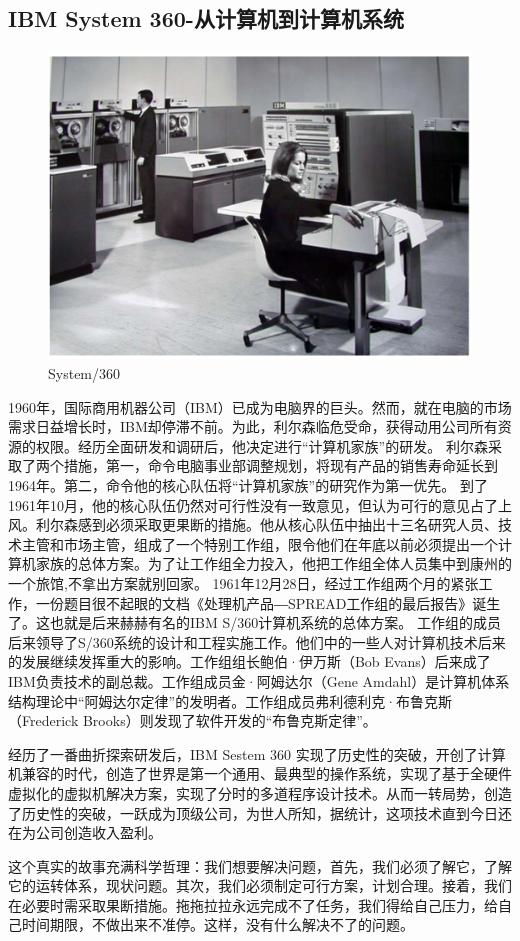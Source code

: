 \documentclass{article}
\begin{document}
\subsection{IBM System 360-从计算机到计算机系统}
\begin{figure}[h!]
	\centering
	\includegraphics[scale=0.4]{20200103000145}
	\caption{System/360}
	\label{fig:univers}
\end{figure}

1960年，国际商用机器公司（IBM）已成为电脑界的巨头。然而，就在电脑的市场需求日益增长时，IBM却停滞不前。为此，利尔森临危受命，获得动用公司所有资源的权限。经历全面研发和调研后，他决定进行“计算机家族”的研发。
利尔森采取了两个措施，第一，命令电脑事业部调整规划，将现有产品的销售寿命延长到1964年。第二，命令他的核心队伍将“计算机家族”的研究作为第一优先。
到了1961年10月，他的核心队伍仍然对可行性没有一致意见，但认为可行的意见占了上风。利尔森感到必须采取更果断的措施。他从核心队伍中抽出十三名研究人员、技术主管和市场主管，组成了一个特别工作组，限令他们在年底以前必须提出一个计算机家族的总体方案。为了让工作组全力投入，他把工作组全体人员集中到康州的一个旅馆,不拿出方案就别回家。
1961年12月28日，经过工作组两个月的紧张工作，一份题目很不起眼的文档《处理机产品―SPREAD工作组的最后报告》诞生了。这也就是后来赫赫有名的IBM S/360计算机系统的总体方案。
工作组的成员后来领导了S/360系统的设计和工程实施工作。他们中的一些人对计算机技术后来的发展继续发挥重大的影响。工作组组长鲍伯·伊万斯（Bob Evans）后来成了IBM负责技术的副总裁。工作组成员金·阿姆达尔（Gene Amdahl）是计算机体系结构理论中“阿姆达尔定律”的发明者。工作组成员弗利德利克·布鲁克斯（Frederick Brooks）则发现了软件开发的“布鲁克斯定律”。\par
经历了一番曲折探索研发后，IBM Sestem 360 实现了历史性的突破，开创了计算机兼容的时代，创造了世界是第一个通用、最典型的操作系统，实现了基于全硬件虚拟化的虚拟机解决方案，实现了分时的多道程序设计技术。从而一转局势，创造了历史性的突破，一跃成为顶级公司，为世人所知，据统计，这项技术直到今日还在为公司创造收入盈利。\par 
这个真实的故事充满科学哲理：我们想要解决问题，首先，我们必须了解它，了解它的运转体系，现状问题。其次，我们必须制定可行方案，计划合理。接着，我们在必要时需采取果断措施。拖拖拉拉永远完成不了任务，我们得给自己压力，给自己时间期限，不做出来不准停。这样，没有什么解决不了的问题。\par 
\end{document}
